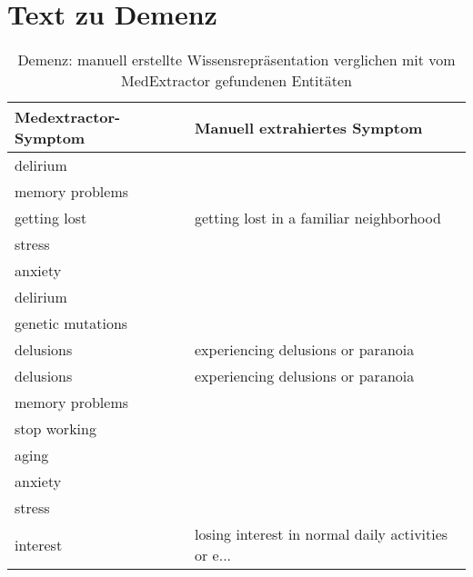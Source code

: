 \section{Text zu Demenz}
\label{sec:dementia} 

\begin{table}[H]
\begin{center}
\begin{tabular}{ll}
\toprule
  Medextractor-Symptom &                       Manuell extrahiertes Symptom \\
\midrule
                  delirium &                                                    \\
     memory problems &                                                    \\
        getting lost &            getting lost in a familiar neighborhood \\
              stress &                                                    \\
             anxiety &                                                    \\
            delirium &                                                    \\
   genetic mutations &                                                    \\
           delusions &                 experiencing delusions or paranoia \\
           delusions &                 experiencing delusions or paranoia \\
     memory problems &                                                    \\
        stop working &                                                    \\
               aging &                                                    \\
             anxiety &                                                    \\
              stress &                                                    \\
            interest & losing interest in normal daily activities or e... \\
\bottomrule
\end{tabular}
\caption{Demenz: manuell erstellte Wissensrepräsentation verglichen mit vom MedExtractor gefundenen Entitäten}
\label{tab:dementia_vergleich_manuell_medextractor}
\end{center}
\end{table}


